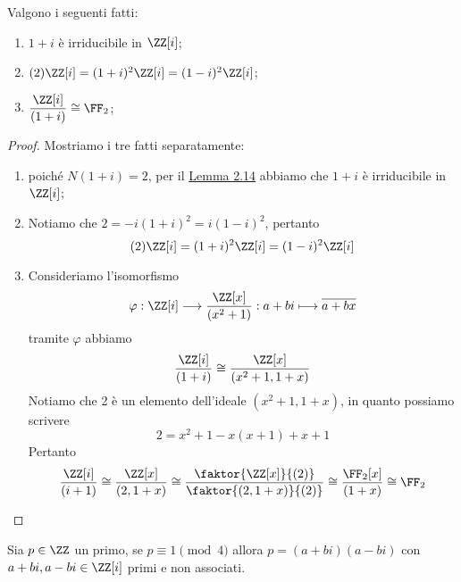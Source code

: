 \documentclass[11pt]{scrartcl}
\begin{document}
\begin{lemma}
    \label{lemma2.15}
    Valgono i seguenti fatti:
    \begin{enumerate}[(1)]
        \item $1 + i$ è irriducibile in $\ZZ[i]$;
        \item $(2)\ZZ[i] = (1 + i)^2\ZZ[i] = (1 - i)^2\ZZ[i]$;
        \item $\displaystyle\frac{\ZZ[i]}{(1 + i)}\cong \FF_2$;
    \end{enumerate}
\end{lemma}

\begin{proof}Mostriamo i tre fatti separatamente:
    \begin{enumerate}[(1)]
        \item poiché $N(1 + i) = 2$, per il \hyperref[lemma2.14]{Lemma 2.14} abbiamo 
        che $1 + i$ è irriducibile in $\ZZ[i]$;
        \item Notiamo che $2 = -i(1 + i)^2 = i(1 - i)^2$, pertanto 
        \[
        (2)\ZZ[i] = (1 + i)^2\ZZ[i] = (1 - i)^2\ZZ[i]
        \]
        \item Consideriamo l'isomorfismo 
        \[
            \varphi: \ZZ[i]\longrightarrow \frac{\ZZ[x]}{(x^2 + 1)}:
            a + bi \longmapsto \overline{a + bx}
        \]
        tramite $\varphi$ abbiamo
        \[
            \frac{\ZZ[i]}{(1 + i)} \cong \frac{\ZZ[x]}{(x^2 + 1, 1 + x)}
        \]
        Notiamo che 2 è un elemento dell'ideale $(x^2 + 1, 1 + x)$, in quanto 
        possiamo scrivere
        \[
            2 = x^2 + 1 - x(x + 1) + x + 1
        \]
        Pertanto
        \[
            \frac{\ZZ[i]}{(i + 1)} \cong \frac{\ZZ[x]}{(2, 1 + x)} \cong 
            \frac{\faktor{\ZZ[x]}{(2)}}{\faktor{(2, 1 + x)}{(2)}} \cong 
            \frac{\FF_2[x]}{(1 + x)} \cong \FF_2
        \]
    \end{enumerate}
\end{proof}

\begin{lemma}
    \label{lemma2.16}
    Sia $p \in \ZZ$ un primo, se $p \equiv 1 \pmod 4$ allora $p = (a + bi)(a - bi)$
    con $a + bi, a - bi \in \ZZ[i]$ primi e non associati.
\end{lemma}
\end{document}
